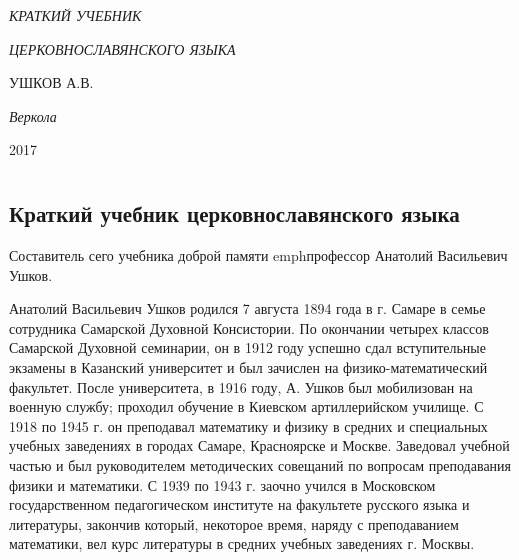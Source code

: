 \documentclass[11pt,a4paper,oneside]{memoir}
\newcommand*{\labelit}[1]{\phantomsection\label{#1}}
\newlength{\tpheight}\setlength{\tpheight}{0.9\textheight}
\newlength{\txtheight}\setlength{\txtheight}{0.9\tpheight}
\newlength{\tpwidth}\setlength{\tpwidth}{0.9\textwidth}
\newlength{\txtwidth}\setlength{\txtwidth}{0.9\tpwidth}
\newlength{\drop}
\newenvironment{showtitle}{%
    \begin{boxminipage}[c][\tpheight]{\tpwidth}
        \centering\begin{vplace}\begin{minipage}[c][\txtheight]{\txtwidth}}%
            {\end{minipage}\end{vplace}\end{boxminipage}}
\newcommand*{\titleCC}{\begingroup%
    \drop=0.1\txtheight
    \vspace*{\drop}
    \centering 
    {\Large\itshape КРАТКИЙ УЧЕБНИК}\\[0.5\drop]
    {\textcolor{Red}{\HUGE\bfseries {\slv{✠}}}}\par
    \vspace{\drop}
    {\LARGE\itshape ЦЕРКОВНОСЛАВЯНСКОГО ЯЗЫКА}\par
    \vfill
    {\Large УШКОВ А.В.}\par
    \vfill
    {\itshape Веркола}\par
    {\scshape 2017}\par
    \vspace*{\drop}
    \endgroup}
\begin{document}
    \begin{titlingpage}
        \begin{showtitle}
            \titleCC
        \end{showtitle}
        \labelit{CC}
        {
            \par\vspace{0.2\baselineskip}
        }
    \end{titlingpage}
    
    \tableofcontents*
    
    \chapter*{}
        \section*{Краткий учебник церковнославянского языка}
        \label{sec:brief}
    
    Составитель сего учебника доброй памяти emph{профессор Анатолий Васильевич Ушков}.
    
    Анатолий Васильевич Ушков родился 7 августа 1894 года в г. Самаре в семье сотрудника Самарской Духовной Консистории. По окончании четырех классов Самарской Духовной семинарии, он в 1912 году успешно сдал вступительные экзамены в Казанский университет и был зачислен на физико-математический факультет. После университета, в 1916 году, А. Ушков был мобилизован на военную службу; проходил обучение в Киевском артиллерийском училище. С 1918 по 1945 г. он преподавал математику и физику в средних и специальных учебных заведениях в городах Самаре, Красноярске и Москве. Заведовал учебной частью и был руководителем методических совещаний по вопросам преподавания физики и математики. С 1939 по 1943 г. заочно учился в Московском государственном педагогическом институте на факультете русского языка и литературы, закончив который, некоторое время, наряду с преподаванием математики, вел курс литературы в средних учебных заведениях г. Москвы.
    
\end{document}
